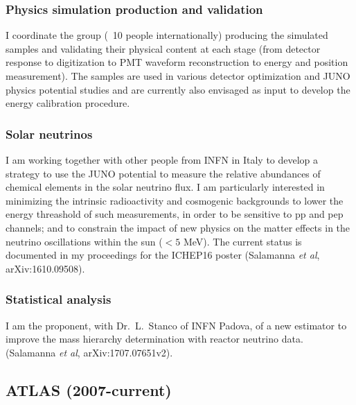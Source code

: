 \documentclass{article}
\begin{document}
\begin{vita}
\subsubsection*{Physics simulation production and validation}
I coordinate the group (~10 people internationally) producing the simulated samples and validating their physical content at each stage (from detector response to digitization to PMT waveform reconstruction to energy and position measurement). The samples are used in various detector optimization and JUNO physics potential studies and are currently also envisaged as input to develop the energy calibration procedure. 

\subsubsection*{Solar neutrinos}
I am working together with other people from INFN in Italy to develop a strategy to use the JUNO potential to measure the relative abundances of chemical elements in the solar neutrino flux. I am particularly interested in minimizing the intrinsic radioactivity and cosmogenic backgrounds to lower the energy threashold of such measurements, in order to be sensitive to pp and pep channels; and to constrain the impact of new physics on the matter effects in the neutrino oscillations within the sun ($<5$ MeV). The current status is documented in my proceedings for the ICHEP16 poster (Salamanna {\it et al}, arXiv:1610.09508).

\subsubsection*{Statistical analysis}
I am the proponent, with Dr.~L.~Stanco of INFN Padova, of a new estimator to improve the mass hierarchy determination with reactor neutrino data. (Salamanna {\it et al}, arXiv:1707.07651v2).

\subsection*{ATLAS (2007-current)}

\end{vita}
\end{document}

